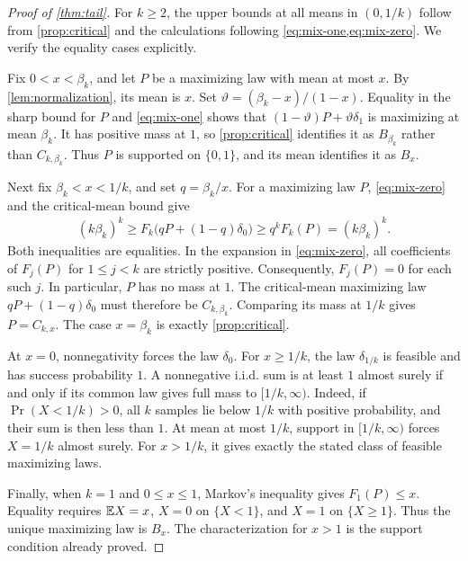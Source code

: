 \begin{proof}[Proof of \cref{thm:tail}]
For $k\ge2$, the upper bounds at all means in $(0,1/k)$ follow from \cref{prop:critical} and the calculations following \cref{eq:mix-one,eq:mix-zero}. We verify the equality cases explicitly.

Fix $0<x<\beta_k$, and let $P$ be a maximizing law with mean at most $x$. By \cref{lem:normalization}, its mean is $x$. Set $\vartheta=(\beta_k-x)/(1-x)$. Equality in the sharp bound for $P$ and \cref{eq:mix-one} shows that $(1-\vartheta)P+\vartheta\delta_1$ is maximizing at mean $\beta_k$. It has positive mass at $1$, so \cref{prop:critical} identifies it as $B_{\beta_k}$ rather than $C_{k,\beta_k}$. Thus $P$ is supported on $\{0,1\}$, and its mean identifies it as $B_x$.

Next fix $\beta_k<x<1/k$, and set $q=\beta_k/x$. For a maximizing law $P$, \cref{eq:mix-zero} and the critical-mean bound give
\begin{align*}
 (k\beta_k)^k\ge F_k\bigl(qP+(1-q)\delta_0\bigr)
 \ge q^kF_k(P)=(k\beta_k)^k.
\end{align*}
Both inequalities are equalities. In the expansion in \cref{eq:mix-zero}, all coefficients of $F_j(P)$ for $1\le j<k$ are strictly positive. Consequently, $F_j(P)=0$ for each such $j$. In particular, $P$ has no mass at $1$. The critical-mean maximizing law $qP+(1-q)\delta_0$ must therefore be $C_{k,\beta_k}$. Comparing its mass at $1/k$ gives $P=C_{k,x}$. The case $x=\beta_k$ is exactly \cref{prop:critical}.

At $x=0$, nonnegativity forces the law $\delta_0$. For $x\ge1/k$, the law $\delta_{1/k}$ is feasible and has success probability $1$. A nonnegative i.i.d. sum is at least $1$ almost surely if and only if its common law gives full mass to $[1/k,\infty)$. Indeed, if $\Pr(X<1/k)>0$, all $k$ samples lie below $1/k$ with positive probability, and their sum is then less than $1$. At mean at most $1/k$, support in $[1/k,\infty)$ forces $X=1/k$ almost surely. For $x>1/k$, it gives exactly the stated class of feasible maximizing laws.

Finally, when $k=1$ and $0\le x\le1$, Markov's inequality gives $F_1(P)\le x$. Equality requires $\mathbb E X=x$, $X=0$ on $\{X<1\}$, and $X=1$ on $\{X\ge1\}$. Thus the unique maximizing law is $B_x$. The characterization for $x>1$ is the support condition already proved.
\end{proof}
